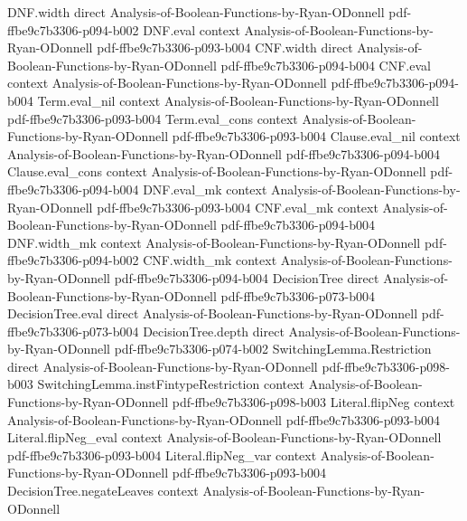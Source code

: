 \begin{theorem}
\proofstep
  {DNF.width}
  {direct}
  {Analysis-of-Boolean-Functions-by-Ryan-ODonnell}
  {pdf-ffbe9c7b3306-p094-b002}
\proofstep
  {DNF.eval}
  {context}
  {Analysis-of-Boolean-Functions-by-Ryan-ODonnell}
  {pdf-ffbe9c7b3306-p093-b004}
\proofstep
  {CNF.width}
  {direct}
  {Analysis-of-Boolean-Functions-by-Ryan-ODonnell}
  {pdf-ffbe9c7b3306-p094-b004}
\proofstep
  {CNF.eval}
  {context}
  {Analysis-of-Boolean-Functions-by-Ryan-ODonnell}
  {pdf-ffbe9c7b3306-p094-b004}
\proofstep
  {Term.eval_nil}
  {context}
  {Analysis-of-Boolean-Functions-by-Ryan-ODonnell}
  {pdf-ffbe9c7b3306-p093-b004}
\proofstep
  {Term.eval_cons}
  {context}
  {Analysis-of-Boolean-Functions-by-Ryan-ODonnell}
  {pdf-ffbe9c7b3306-p093-b004}
\proofstep
  {Clause.eval_nil}
  {context}
  {Analysis-of-Boolean-Functions-by-Ryan-ODonnell}
  {pdf-ffbe9c7b3306-p094-b004}
\proofstep
  {Clause.eval_cons}
  {context}
  {Analysis-of-Boolean-Functions-by-Ryan-ODonnell}
  {pdf-ffbe9c7b3306-p094-b004}
\proofstep
  {DNF.eval_mk}
  {context}
  {Analysis-of-Boolean-Functions-by-Ryan-ODonnell}
  {pdf-ffbe9c7b3306-p093-b004}
\proofstep
  {CNF.eval_mk}
  {context}
  {Analysis-of-Boolean-Functions-by-Ryan-ODonnell}
  {pdf-ffbe9c7b3306-p094-b004}
\proofstep
  {DNF.width_mk}
  {context}
  {Analysis-of-Boolean-Functions-by-Ryan-ODonnell}
  {pdf-ffbe9c7b3306-p094-b002}
\proofstep
  {CNF.width_mk}
  {context}
  {Analysis-of-Boolean-Functions-by-Ryan-ODonnell}
  {pdf-ffbe9c7b3306-p094-b004}
\proofstep
  {DecisionTree}
  {direct}
  {Analysis-of-Boolean-Functions-by-Ryan-ODonnell}
  {pdf-ffbe9c7b3306-p073-b004}
\proofstep
  {DecisionTree.eval}
  {direct}
  {Analysis-of-Boolean-Functions-by-Ryan-ODonnell}
  {pdf-ffbe9c7b3306-p073-b004}
\proofstep
  {DecisionTree.depth}
  {direct}
  {Analysis-of-Boolean-Functions-by-Ryan-ODonnell}
  {pdf-ffbe9c7b3306-p074-b002}
\proofstep
  {SwitchingLemma.Restriction}
  {direct}
  {Analysis-of-Boolean-Functions-by-Ryan-ODonnell}
  {pdf-ffbe9c7b3306-p098-b003}
\proofstep
  {SwitchingLemma.instFintypeRestriction}
  {context}
  {Analysis-of-Boolean-Functions-by-Ryan-ODonnell}
  {pdf-ffbe9c7b3306-p098-b003}
\proofstep
  {Literal.flipNeg}
  {context}
  {Analysis-of-Boolean-Functions-by-Ryan-ODonnell}
  {pdf-ffbe9c7b3306-p093-b004}
\proofstep
  {Literal.flipNeg_eval}
  {context}
  {Analysis-of-Boolean-Functions-by-Ryan-ODonnell}
  {pdf-ffbe9c7b3306-p093-b004}
\proofstep
  {Literal.flipNeg_var}
  {context}
  {Analysis-of-Boolean-Functions-by-Ryan-ODonnell}
  {pdf-ffbe9c7b3306-p093-b004}
\proofstep
  {DecisionTree.negateLeaves}
  {context}
  {Analysis-of-Boolean-Functions-by-Ryan-ODonnell}

\end{theorem}
